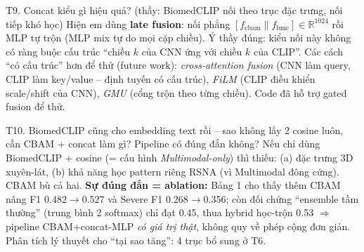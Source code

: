 \documentclass[12pt,a4paper]{article}
\begin{document}
\begin{qabox}{T9. Concat kiểu gì hiệu quả? (thầy: BiomedCLIP nối theo trục đặc trưng, nối tiếp khó học)}
Hiện em dùng \textbf{late fusion}: nối phẳng $[f_{\text{cbam}} \| f_{\text{bmc}}]\in\mathbb{R}^{1024}$ rồi MLP tự trộn (MLP mix tự do mọi cặp chiều). Ý thầy đúng: kiểu nối này không có ràng buộc cấu trúc ``chiều $k$ của CNN ứng với chiều $k$ của CLIP''. Các cách ``có cấu trúc'' hơn để thử (future work): \emph{cross-attention fusion} (CNN làm query, CLIP làm key/value -- định tuyến có cấu trúc), \emph{FiLM} (CLIP điều khiển scale/shift của CNN), \emph{GMU} (cổng trộn theo từng chiều). Code đã hỗ trợ gated fusion để thử.
\end{qabox}

\begin{qabox}{T10. BiomedCLIP cũng cho embedding text rồi -- sao không lấy 2 cosine luôn, cần CBAM + concat làm gì? Pipeline có đúng đắn không?}
Nếu chỉ dùng BiomedCLIP + cosine (= cấu hình \emph{Multimodal-only}) thì thiếu: (a) đặc trưng 3D xuyên-lát, (b) khả năng học pattern riêng RSNA (vì Multimodal đông cứng). CBAM bù cả hai. \textbf{Sự đúng đắn = ablation:} Bảng 1 cho thấy thêm CBAM nâng F1 0.482$\to$0.527 và Severe F1 0.268$\to$0.356; còn đối chứng ``ensemble tầm thường'' (trung bình 2 softmax) chỉ đạt 0.45, thua hybrid học-trộn 0.53 $\Rightarrow$ pipeline CBAM+concat-MLP \emph{có giá trị thật}, không quy về phép cộng đơn giản. Phân tích lý thuyết cho ``tại sao tăng'': 4 trục bổ sung ở T6.
\end{qabox}
\end{document}
